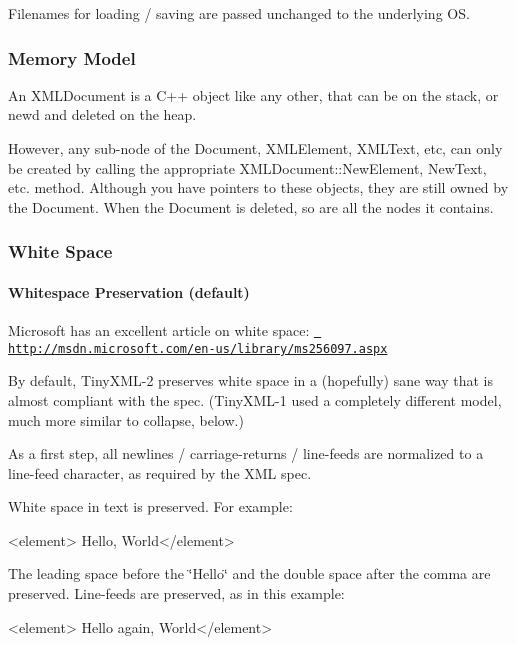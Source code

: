 Filenames for loading / saving are passed unchanged to the underlying OS.

\subsubsection*{Memory Model}

An X\+M\+L\+Document is a C++ object like any other, that can be on the stack, or new\textquotesingle{}d and deleted on the heap.

However, any sub-\/node of the Document, X\+M\+L\+Element, X\+M\+L\+Text, etc, can only be created by calling the appropriate X\+M\+L\+Document\+::\+New\+Element, New\+Text, etc. method. Although you have pointers to these objects, they are still owned by the Document. When the Document is deleted, so are all the nodes it contains.

\subsubsection*{White Space}

\paragraph*{Whitespace Preservation (default)}

Microsoft has an excellent article on white space\+: \href{http://msdn.microsoft.com/en-us/library/ms256097.aspx}{\texttt{ http\+://msdn.\+microsoft.\+com/en-\/us/library/ms256097.\+aspx}}

By default, Tiny\+X\+M\+L-\/2 preserves white space in a (hopefully) sane way that is almost compliant with the spec. (Tiny\+X\+M\+L-\/1 used a completely different model, much more similar to \textquotesingle{}collapse\textquotesingle{}, below.)

As a first step, all newlines / carriage-\/returns / line-\/feeds are normalized to a line-\/feed character, as required by the X\+ML spec.

White space in text is preserved. For example\+: \begin{DoxyVerb}<element> Hello,  World</element>
\end{DoxyVerb}


The leading space before the \char`\"{}\+Hello\char`\"{} and the double space after the comma are preserved. Line-\/feeds are preserved, as in this example\+: \begin{DoxyVerb}<element> Hello again,
          World</element>
\end{DoxyVerb}


